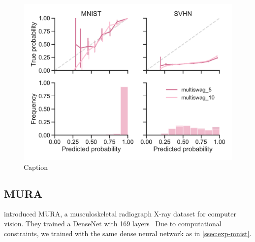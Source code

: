 \documentclass[10pt,a4paper,twocolumn]{article}
\begin{document}
\begin{figure}
    \centering
    \includegraphics[width=\linewidth]{figures/MnistMultiSwag.pdf}
    \caption{Caption}
    \label{fig:cross-calibration-multiswag}
\end{figure}

\subsection{MURA}\label{ssec:mura}

\textcite{rajpurkar2017mura} introduced MURA, a musculoskeletal radiograph X-ray dataset for computer vision.
They trained a DenseNet with 169 layers~\cite{huang2017densely}
Due to computational constraints, we trained with the same dense neural network as in \cref{ssec:exp-mnist}.
\end{document}
